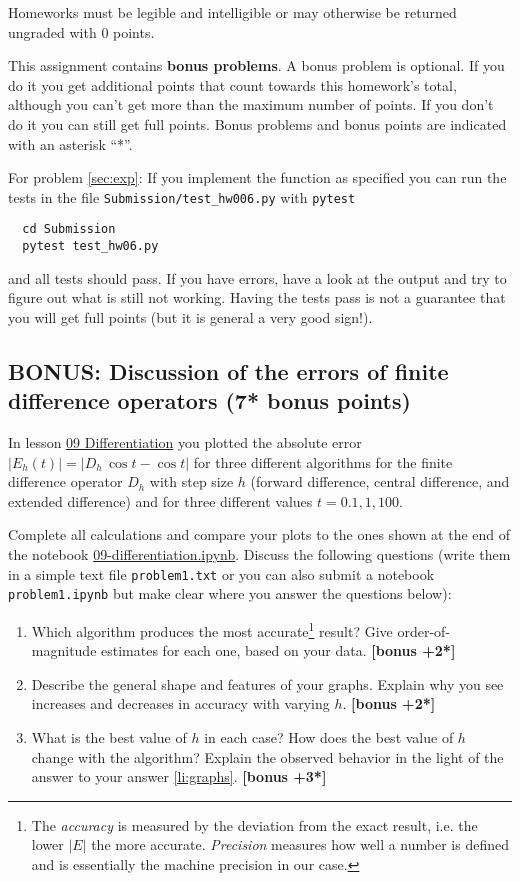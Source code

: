 \documentclass[paper=letter]{scrartcl}
\newcommand{\anumber}{6}
\newcounter{TotalBonus}
\newcommand{\bonus}[1]{\textbf{[bonus +#1*]}\stepcounter{TotalBonus}}
\newenvironment{enuma}{\begin{enumerate}[label=(\alph*)]}{\end{enumerate}}
\newcommand{\anum}{0\anumber}
\begin{document}
Homeworks must be legible and intelligible or may otherwise be
returned ungraded with 0 points.

This assignment contains \textbf{bonus problems}. A bonus problem is
optional. If you do it you get additional points that count towards
this homework's total, although you can't get more than the maximum
number of points. If you don't do it you can still get full
points. Bonus problems and bonus points are indicated with an asterisk
``*''.

For problem \ref{sec:exp}: If you implement the
function as specified you can run the tests in the file
\texttt{Submission/test\_hw0\anum.py} with \texttt{pytest}
\begin{verbatim}
  cd Submission
  pytest test_hw06.py
\end{verbatim}
and all tests should pass. If you have errors, have a look at the
output and try to figure out what is still not working. Having the
tests pass is not a guarantee that you will get full points (but it is
general a very good sign!). 

\subsection{BONUS: Discussion of the errors of finite difference operators
  (7* bonus points)}
\label{sec:fderrors}

In lesson
\href{https://asu-compmethodsphysics-phy494.github.io/ASU-PHY494/2019/02/14/09_Differentiation/}{09 Differentiation} you plotted the absolute error
$|E_{h}(t)| = |D_{h}\,\cos t - \cos t|$ for three different algorithms
for the finite difference operator $D_{h}$ with step size $h$ (forward
difference, central difference, and extended difference) and for three
different values $t = 0.1, 1, 100$.

Complete all calculations and compare your plots to the ones shown at
the end of the notebook
\href{https://github.com/ASU-CompMethodsPhysics-PHY494/PHY494-resources/blob/master/09_differentiation/09-differentiation.ipynb}{09-differentiation.ipynb}. Discuss
the following questions (write them in a simple text file
\texttt{problem1.txt} or you can also submit a notebook
\texttt{problem1.ipynb} but make clear where you answer the questions
below):

\begin{enuma}
\item Which algorithm produces the most accurate\footnote{The
    \emph{accuracy} is measured by the deviation from the exact
    result, i.e. the lower $|E|$ the more accurate. \emph{Precision}
    measures how well a number is defined and is essentially the
    machine precision in our case.} result? Give order-of-magnitude
  estimates for each one, based on your data. \bonus{2}
\item \label{li:graphs} Describe the general shape and features of
  your graphs. Explain why you see increases and decreases in accuracy
  with varying $h$. \bonus{2}
\item What is the best value of $h$ in each case? How does the best
  value of $h$ change with the algorithm? Explain the observed
  behavior in the light of the answer to your answer \ref{li:graphs}. 
  \bonus{3}
\end{enuma}
\end{document}
